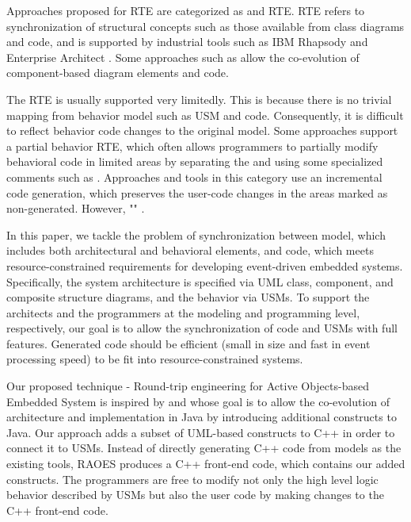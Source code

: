 Approaches proposed for RTE are categorized as  and  RTE.
 RTE refers to synchronization of structural concepts such as those available from class diagrams and code, and is supported by industrial tools such as IBM Rhapsody \cite{ibm_rhapsody} and Enterprise Architect \cite{sparxsystems_enterprise_2014}.
Some approaches such as \cite{langhammer2013co, kramer2015change} allow the co-evolution of component-based diagram elements and code.

The  RTE is usually supported very limitedly. 
This is because there is no trivial mapping from behavior model such as USM and code.
Consequently, it is difficult to reflect behavior code changes to the original model.
Some approaches support a partial behavior RTE, which often allows programmers to partially modify behavioral code in limited areas by separating the  and  \cite{ibm_rhapsody,steinberg2008emf} using some specialized comments such as .
Approaches and tools in this category use an incremental code generation, which preserves the user-code changes in the areas marked as non-generated.
However, "" \cite{zheng2012enhancing}.


In this paper, we tackle the problem of synchronization between model, which includes both architectural and behavioral elements, and  code, which meets resource-constrained requirements for developing event-driven embedded systems.
Specifically, the system architecture is specified via UML class, component, and composite structure diagrams, and the behavior via USMs.
To support the architects and the programmers at the modeling and programming level, respectively, our goal is to allow the synchronization of code and USMs with full features.
Generated code should be efficient (small in size and fast in event processing speed) to be fit into resource-constrained systems. 

Our proposed technique  - Round-trip engineering for Active Objects-based Embedded System is inspired by  \cite{aldrich2002archjava} and  \cite{ubayashi2010archface} whose goal is to allow the co-evolution of architecture and implementation in Java by introducing additional constructs to Java.
Our approach adds  a subset of UML-based constructs to C++ in order to connect it to USMs.
Instead of directly generating C++ code from models as the existing tools, RAOES produces a C++ front-end code, which contains our added constructs.
The programmers are free to modify not only the high level logic behavior described by USMs but also the user code by making changes to the C++ front-end code.

